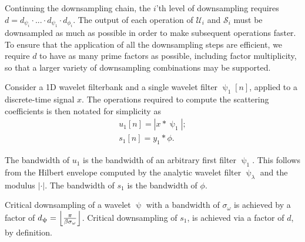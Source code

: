 \documentclass[journal]{IEEEtran}
\DeclarePairedDelimiter\ceil{\lceil}{\rceil}
\DeclarePairedDelimiter\floor{\lfloor}{\rfloor}
\begin{document}
Continuing the downsampling chain, the $i$'th level of downsampling requires $d = d_{\psi_i} \cdot ... \cdot d_{\psi_1} \cdot d_{\phi_i}$. The output of each operation of $\mathcal{U}_i$ and $\mathcal{S}_i$ must be downsampled as much as possible in order to make subsequent operations faster. To ensure that the application of all the downsampling steps are efficient, we require $d$ to have as many prime factors as possible, including factor multiplicity, so that a larger variety of downsampling combinations may be supported.





Consider a 1D wavelet filterbank and a single wavelet filter $\uppsi_1[n]$, applied to a discrete-time signal $x$. The operations required to compute the scattering coefficients is then notated for simplicity as
\begin{gather}
    u_1[n] = \left|  x * \uppsi_1   \right|; \\
    s_1[n] = y_1 * \phi.
\end{gather}

The bandwidth of $u_1$ is the bandwidth of an arbitrary first filter $\uppsi_1$. This follows from the Hilbert envelope computed by the analytic wavelet filter $\uppsi_\lambda$ and the modulus $|\cdot |$. The bandwidth of $s_1$ is the bandwidth of $\phi$.

Critical downsampling of a wavelet $\uppsi$ with a bandwidth of $\sigma_\omega$ is achieved by a factor of $d_{\uppsi} = \floor*{\frac{ \pi }{\beta\sigma_\omega}}$. Critical downsampling of $s_1$, is achieved via a factor of $d$, by definition.
\end{document}
